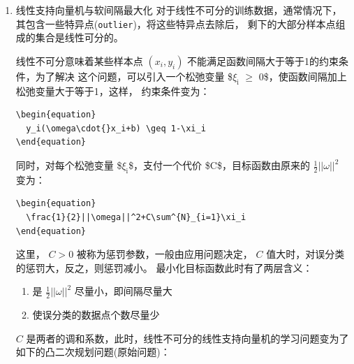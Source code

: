 \documentclass[11pt]{ctexart}
\begin{document}
\begin{enumerate}
\begin{enumerate}
\begin{enumerate}
\begin{enumerate}
于是，分离超平面为：
\lstset{language=[LaTeX]TeX,label= ,caption= ,captionpos=b,numbers=none}
\begin{lstlisting}
\begin{equation}
  \frac{1}{2}x^{(1)}+\frac{1}{2}x^{(2)} - 2 = 0
\end{equation}
\end{lstlisting}
分类决策函数为
\lstset{language=[LaTeX]TeX,label= ,caption= ,captionpos=b,numbers=none}
\begin{lstlisting}
\begin{equation}
  f(x) = \frac{1}{2}x^{(1)}+\frac{1}{2}x^{(2)} - 2
\end{equation}
\end{lstlisting}
\end{enumerate}
\end{enumerate}
\end{enumerate}
\item 线性支持向量机与软间隔最大化
\label{sec:orgheadline77}
对于线性不可分的训练数据，通常情况下，其包含一些特异点(\texttt{outlier})，将这些特异点去除后，
剩下的大部分样本点组成的集合是线性可分的。

线性不可分意味着某些样本点 \((x_i, y_i)\) 不能满足函数间隔大于等于1的约束条件，为了解决
这个问题，可以引入一个松弛变量 \$\(\xi_{\text{i}}\) \(\ge\) 0\$，使函数间隔加上松弛变量大于等于1，这样，
约束条件变为：

\lstset{language=[LaTeX]TeX,label= ,caption= ,captionpos=b,numbers=none}
\begin{lstlisting}
\begin{equation}
  y_i(\omega\cdot{}x_i+b) \geq 1-\xi_i
\end{equation}
\end{lstlisting}

同时，对每个松弛变量 \$\(\xi_{\text{i}}\)\$，支付一个代价 \$C\$，目标函数由原来的 \(\frac{1}{2}||\omega||^2\)
变为：

\lstset{language=[LaTeX]TeX,label= ,caption= ,captionpos=b,numbers=none}
\begin{lstlisting}
\begin{equation}
  \frac{1}{2}||\omega||^2+C\sum^{N}_{i=1}\xi_i
\end{equation}
\end{lstlisting}

这里， \(C>0\) 被称为惩罚参数，一般由应用问题决定， \(C\) 值大时，对误分类的惩罚大，反之，则惩罚减小。
最小化目标函数此时有了两层含义：
\begin{enumerate}
\item 是 \(\frac{1}{2}||\omega||^2\) 尽量小，即间隔尽量大
\item 使误分类的数据点个数尽量少
\end{enumerate}
\(C\) 是两者的调和系数，此时，线性不可分的线性支持向量机的学习问题变为了如下的凸二次规划问题(原始问题)：


\end{enumerate}
\end{document}

